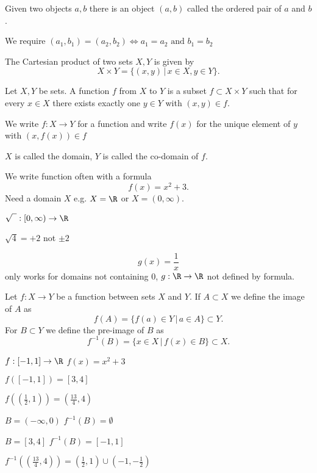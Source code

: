 \documentclass[10pt, a4paper]{article}
\begin{document}
Given two objects $a, b$ there is an object $(a, b)$ called the ordered pair of $a$ and $b$.

We require $(a_1, b_1) = (a_2, b_2) \iff a_1 = a_2 \text{ and } b_1 = b_2$

\begin{definition}
    The Cartesian product of two sets $X, Y$ is given by
    \[
    X \times Y = \{(x, y)\, |\, x \in X, y \in Y\}.
    \]
\end{definition}

\begin{definition}[Function]
    Let $X, Y$ be sets.
    A function $f$ from $X$ to $Y$ is a subset $f \subset X \times Y$ such that
    for every $x \in X$ there exists exactly one $y \in Y$ with $(x, y) \in f$.
    
    We write $f : X \to Y$ for a function and
    write $f(x)$ for the unique element of $y$ with $(x, f(x)) \in f$

    $X$ is called the domain,
    $Y$ is called the co-domain of $f$.
\end{definition}
We write function often with a formula
\[
f(x) = x ^ 2 + 3.
\]
Need a domain $X$ e.g. $X = \R$ or $X = (0, \infty)$.

\begin{example}
    $\sqrt{\phantom{1}} : [0, \infty) \to \R$

    $\sqrt{4} = +2$ not $\pm2$
\end{example}
\begin{example}
    \[
    g(x) = \frac{1}{x}
    \]
    only works for domains not containing $0$, $g: \R \to \R$ not defined by formula.
\end{example}

\begin{definition}
    Let $f : X \to Y$ be a function between sets $X$ and $Y$. If $A \subset X$ we define the image of $A$ as
    \[
    f(A) = \{f(a) \in Y\,|\, a \in A\} \subset Y.
    \]
    For $B \subset Y$ we define the pre-image of $B$ as
    \[
    f^{-1}(B) = \{x \in X\,|\,f(x) \in B\} \subset X.
    \]
\end{definition}

\begin{example}
    $f: [-1, 1] \to \R$ $f(x) = x ^ 2 + 3$

    $f([-1, 1]) = [3, 4]$

    $f\left(\left(\frac{1}{2}, 1\right)\right) = \left(\frac{13}{4}, 4\right)$

    $B = (-\infty, 0)$
    $f^{-1}(B) = \emptyset$

    $B = [3, 4]$
    $f^{-1}(B) = [-1, 1]$
    
    $f^{-1}\left(\left(\frac{13}{4}, 4\right)\right) =
    \left(\frac{1}{2}, 1\right) \cup \left(-1, -\frac{1}{2}\right)$
\end{example}
\end{document}
